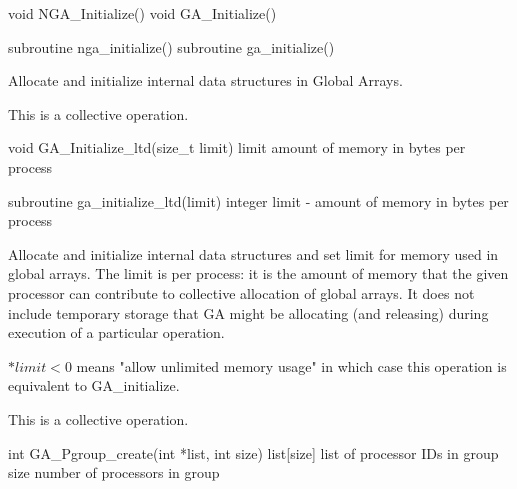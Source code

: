 \documentclass[12pt]{article}
\begin{document}

\begin{capi}
void NGA_Initialize()
void GA_Initialize()
\end{capi}

\begin{fapi}
subroutine nga_initialize()
subroutine ga_initialize()
\end{fapi}

\begin{desc}

Allocate and initialize internal data structures in Global Arrays.

This is a collective operation.

\end{desc}


\begin{capi}
void GA_Initialize_ltd(size_t limit)
   limit      amount of memory in bytes per process            \access{[input]} 
\end{capi}

\begin{fapi}
subroutine ga_initialize_ltd(limit)
   integer limit  - amount of memory in bytes per process      \access{[input]} 
\end{fapi}

\begin{desc}

  Allocate and initialize internal data structures and set limit for
  memory used in global arrays. The limit is per process: it is the
  amount of memory that the given processor can contribute to
  collective allocation of global arrays. It does not include
  temporary storage that GA might be allocating (and releasing) during
  execution of a particular operation.

  $*limit < 0$ means "allow unlimited memory usage" in which case this
  operation is equivalent to GA_initialize.

This is a collective operation.

\end{desc}


\begin{capi}
int GA_Pgroup_create(int *list, int size)
   list[size]                     list of processor IDs in group   \access{[input]} 
   size                           number of processors in group    \access{[input]} 
\end{capi}
\end{document}
